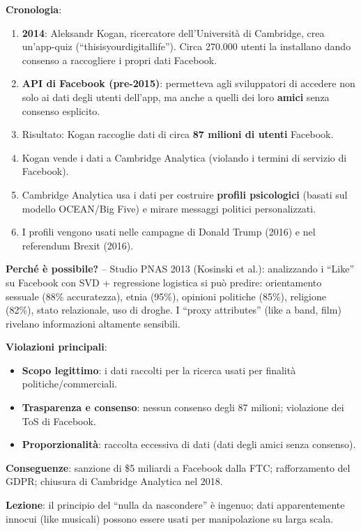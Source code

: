 \documentclass[a4paper,11pt]{article}
\begin{document}
\textbf{Cronologia}:
\begin{enumerate}
  \item \textbf{2014}: Aleksandr Kogan, ricercatore dell'Universit\`{a} di Cambridge, crea un'app-quiz (``thisisyourdigitallife''). Circa 270.000 utenti la installano dando consenso a raccogliere i propri dati Facebook.
  \item \textbf{API di Facebook (pre-2015)}: permetteva agli sviluppatori di accedere non solo ai dati degli utenti dell'app, ma anche a quelli dei loro \textbf{amici} senza consenso esplicito.
  \item Risultato: Kogan raccoglie dati di circa \textbf{87 milioni di utenti} Facebook.
  \item Kogan vende i dati a Cambridge Analytica (violando i termini di servizio di Facebook).
  \item Cambridge Analytica usa i dati per costruire \textbf{profili psicologici} (basati sul modello OCEAN/Big Five) e mirare messaggi politici personalizzati.
  \item I profili vengono usati nelle campagne di Donald Trump (2016) e nel referendum Brexit (2016).
\end{enumerate}

\textbf{Perch\'{e} \`{e} possibile?} -- Studio PNAS 2013 (Kosinski et al.): analizzando i ``Like'' su Facebook con SVD + regressione logistica si pu\`{o} predire: orientamento sessuale (88\% accuratezza), etnia (95\%), opinioni politiche (85\%), religione (82\%), stato relazionale, uso di droghe. I ``proxy attributes'' (like a band, film) rivelano informazioni altamente sensibili.

\textbf{Violazioni principali}:
\begin{itemize}
  \item \textbf{Scopo legittimo}: i dati raccolti per la ricerca usati per finalit\`{a} politiche/commerciali.
  \item \textbf{Trasparenza e consenso}: nessun consenso degli 87 milioni; violazione dei ToS di Facebook.
  \item \textbf{Proporzionalit\`{a}}: raccolta eccessiva di dati (dati degli amici senza consenso).
\end{itemize}

\textbf{Conseguenze}: sanzione di \$5 miliardi a Facebook dalla FTC; rafforzamento del GDPR; chiusura di Cambridge Analytica nel 2018.

\textbf{Lezione}: il principio del ``nulla da nascondere'' \`{e} ingenuo; dati apparentemente innocui (like musicali) possono essere usati per manipolazione su larga scala.
\end{document}
